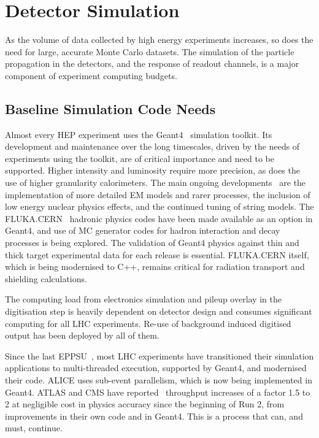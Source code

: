 \documentclass[10pt,a4paper]{article}
\begin{document}
\section{Detector Simulation}\label{detector-simulation}

As the volume of data collected by high energy experiments increases, so
does the need for large, accurate Monte Carlo datasets. The simulation
of the particle propagation in the detectors, and the response of readout
channels, is a major component of experiment computing budgets.

\subsection{Baseline Simulation Code
Needs}\label{baseline-simulation-code-needs}

Almost every HEP experiment uses the Geant4~\cite{ALLISON2016187, 1610988, GEANT4:2002zbu}
simulation toolkit. Its
development and maintenance over the long timescales, driven by the needs of
experiments using the toolkit, are of critical importance and need to be
supported. Higher intensity and luminosity require more precision, as does the
use of higher granularity calorimeters. The main ongoing
developments~\cite{g4inputs} are the implementation of more detailed EM models
and rarer processes, the inclusion of low energy nuclear physics effects, and
the continued tuning of string models. The
FLUKA.CERN~\cite{FLUKA:new_capabiliies, battistoni_2024_stv3r-7ar12} hadronic
physics codes have been made available as an option in Geant4, and use of MC
generator codes for hadron interaction and decay processes is being explored.
The validation of Geant4 physics against thin and thick target experimental data
for each release is essential. FLUKA.CERN itself, which is being modernised to
C++, remains critical for radiation transport and shielding calculations.

The computing load from electronics simulation and pileup overlay in the
digitisation step is heavily dependent on detector design and consumes
significant computing for all LHC experiments. Re-use of background
induced digitised output has been deployed by all of them.

Since the last EPPSU~\cite{European:2720131}, most LHC experiments have transitioned
their simulation applications to multi-threaded execution, supported by Geant4,
and modernised their code. ALICE uses sub-event parallelism, which is now being
implemented in Geant4. ATLAS and CMS have
reported~\cite{ATLAS:2024_swcomp_run3, CMS:computing_results_2023} throughput
increases of a factor 1.5 to 2 at negligible cost in physics accuracy since the
beginning of Run 2, from improvements in their own code and in Geant4. This is a
process that can, and must, continue.
\end{document}
